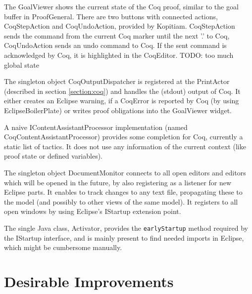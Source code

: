 \documentclass{article}
\begin{document}
The GoalViewer shows the current state of the Coq proof, similar to the goal buffer in ProofGeneral. There are two buttons with connected actions, CoqStepAction and CoqUndoAction, provided by Kopitiam. CoqStepAction sends the command from the current Coq marker until the next '.' to Coq, CoqUndoAction sends an undo command to Coq. If the sent command is acknowledged by Coq, it is highlighted in the CoqEditor. TODO: too much global state

The singleton object CoqOutputDispatcher is registered at the PrintActor (described in section \ref{section:coq}) and handles the (stdout) output of Coq. It either creates an Eclipse warning, if a CoqError is reported by Coq (by using EclipseBoilerPlate) or writes proof obligations into the GoalViewer widget.

A naive IContentAssistantProcessor implementation (named CoqContentAssistantProcessor) provides some completion for Coq, currently a static list of tactics. It does not use any information of the current context (like proof state or defined variables).

The singleton object DocumentMonitor connects to all open editors and editors which will be opened in the future, by also registering as a listener for new Eclipse parts. It enables to track changes to any text file, propagating these to the model (and possibly to other views of the same model). It registers to all open windows by using Eclipse's IStartup extension point.

The single Java class, Activator, provides the \texttt{earlyStartup} method required by the IStartup interface, and is mainly present to find needed imports in Eclipse, which might be cumbersome manually.

\section{Desirable Improvements} \label{section:improvements}
\end{document}

